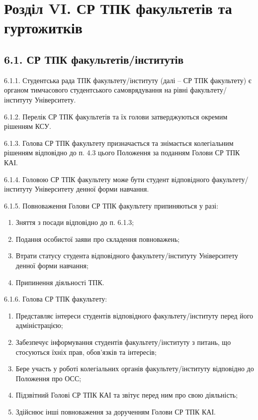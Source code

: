 \section*{Розділ VI. СР ТПК факультетів та гуртожитків}

\subsection*{6.1. СР ТПК факультетів/інститутів}
    6.1.1. Студентська рада ТПК факультету/інституту (далі -- СР ТПК факультету) є органом тимчасового студентського самоврядування на рівні факультету/інституту Університету.

    6.1.2. Перелік СР ТПК факультетів та їх голови затверджуються окремим рішенням КСУ.

    6.1.3. Голова СР ТПК факультету призначається та знімається колегіальним рішенням відповідно до п. 4.3 цього Положення за поданням Голови СР ТПК КАІ.

    6.1.4. Головою СР ТПК факультету може бути студент відповідного факультету/інституту Університету денної форми навчання.

    6.1.5. Повноваження Голови СР ТПК факультету припиняються у разі:

        \begin{enumerate}[label=\alph*)]
            \item Зняття з посади відповідно до п. 6.1.3;
            \item Подання особистої заяви про складення повноважень;
            \item Втрати статусу студента відповідного факультету/інституту Університету денної форми навчання;
            \item Припинення діяльності ТПК.
        \end{enumerate}

    6.1.6. Голова СР ТПК факультету:

        \begin{enumerate}[label=\alph*)]
            \item Представляє інтереси студентів відповідного факультету/інституту перед його адміністрацією;
            \item Забезпечує інформування студентів факультету/інституту з питань, що стосуються їхніх прав, обов'язків та інтересів;
            \item Бере участь у роботі колегіальних органів факультету/інституту відповідно до Положення про ОСС;
            \item Підзвітний Голові СР ТПК КАІ та звітує перед ним про свою діяльність;
            \item Здійснює інші повноваження за дорученням Голови СР ТПК КАІ.
        \end{enumerate}

